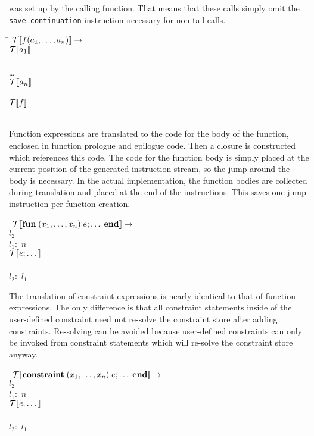 was set up by the calling function. That means that these calls simply
omit the {\tt save-continuation} instruction necessary for non-tail
calls.
%
\begin{tabbing}
\qquad \= \quad \kill
${\mathcal{T}{\normalfont [\![} f(a_1,\dots,a_n) {\normalfont ]\!]}} \rightarrow$\\
\>${\mathcal{T}{\normalfont [\![} a_1 {\normalfont ]\!]}}$\\
\\
\>\dots{}\\
\>${\mathcal{T}{\normalfont [\![} a_n {\normalfont ]\!]}}$\\
\\
\>${\mathcal{T}{\normalfont [\![} f {\normalfont ]\!]}}$\\
\\
\end{tabbing}
%
Function expressions are translated to the code for the body of the
function, enclosed in function prologue and epilogue code.  Then a
closure is constructed which references this code.  The code for the
function body is simply placed at the current position of the
generated instruction stream, so the jump around the body is
necessary.  In the actual implementation, the function bodies are
collected during translation and placed at the end of the
instructions.  This saves one jump instruction per function creation.
%
\begin{tabbing}
\qquad \= \quad \kill
${\mathcal{T}{\normalfont [\![} \text{\bf fun}\;(x_1,\dots,x_n)\; e;\dots\;\text{\bf end} {\normalfont ]\!]}} \rightarrow$\\
 $l_2$\\
$l_1:$ $n$\\
\>${\mathcal{T}{\normalfont [\![} e;\dots {\normalfont ]\!]}}$\\
\\
$l_2:$ $l_1$
\end{tabbing}
%
The translation of constraint expressions is nearly identical to that
of function expressions.  The only difference is that all constraint
statements inside of the user-defined constraint need not re-solve the
constraint store after adding constraints.  Re-solving can be avoided
because user-defined constraints can only be invoked from constraint
statements which will re-solve the constraint store anyway.
%
\begin{tabbing}
\qquad \= \quad \kill
${\mathcal{T}{\normalfont [\![} \text{\bf constraint}\;(x_1,\dots,x_n)\; e;\dots\;\text{\bf end} {\normalfont ]\!]}} \rightarrow$\\
 $l_2$\\
$l_1:$ $n$\\
\>${\mathcal{T}{\normalfont [\![} e;\dots {\normalfont ]\!]}}$\\
\\
$l_2:$ $l_1$
\end{tabbing}
